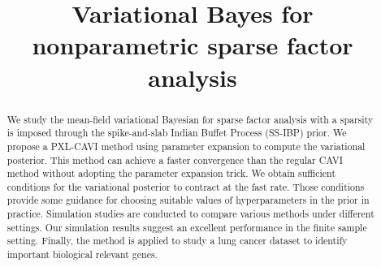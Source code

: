 \documentclass[pdftex]{imsart}
\theoremstyle{plain}
\begin{document}
\begin{frontmatter}

\title{Variational Bayes for nonparametric sparse factor analysis}



\author{ }

 
 

\address{University of California, Davis \\ 
 4242 Mathematical Science Building\\
 Department of Statistics\\
 One Shield Avenue, Davis, CA 95618\\
  }



\begin{abstract}
We study the mean-field variational Bayesian for sparse factor analysis with a sparsity is imposed through the spike-and-slab Indian Buffet Process (SS-IBP) prior. We propose a PXL-CAVI method using parameter expansion to compute the variational posterior. This method can achieve a faster convergence than the regular CAVI method without adopting the parameter expansion trick.
We obtain sufficient conditions for the variational posterior to contract at the fast rate. Those conditions provide some guidance for choosing suitable values of hyperparameters in the prior in practice. Simulation studies are conducted to compare various methods under different settings. Our simulation results suggest an excellent performance in the finite sample setting. Finally, the method is applied to study a lung cancer dataset to identify important biological relevant genes.

\end{abstract}


\begin{keyword}[class=MSC]
\end{keyword}

\begin{keyword}
\end{keyword}

\end{frontmatter}
\end{document}

